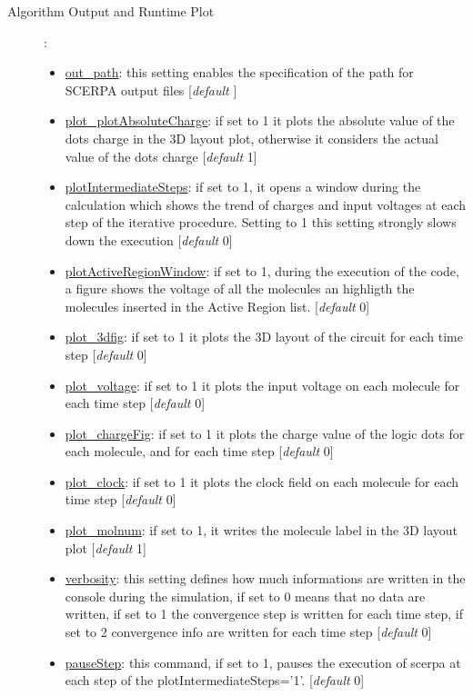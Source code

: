 \documentclass[a4paper,10pt]{article}
\begin{document}
\begin{description}
\item[Algorithm Output and Runtime Plot]:
	\begin{itemize}
	\item \underline{out\_path}: this setting enables the specification of the path for SCERPA output files [\textit{default} \textcolor{mylilas}{\textquotesingle}] 
	\item \underline{plot\_plotAbsoluteCharge}: if set to 1 it plots the absolute value of the dots charge in the 3D layout plot, otherwise it considers the actual value of the dots charge [\textit{default} 1] 
	\item \underline{plotIntermediateSteps}: if set to 1, it opens a window during the calculation which shows the trend of charges and input voltages at each step of the iterative procedure. Setting to 1 this setting strongly slows down the execution [\textit{default} 0] 
	\item \underline{plotActiveRegionWindow}: if set to 1, during the execution of the code, a figure shows the voltage of all the molecules an highligth the molecules inserted in the Active Region list.  [\textit{default} 0] 
	\item \underline{plot\_3dfig}: if set to 1 it plots the 3D layout of the circuit for each time step [\textit{default} 0] 
	\item \underline{plot\_voltage}: if set to 1 it plots the input voltage on each molecule for each time step [\textit{default} 0] 
	\item \underline{plot\_chargeFig}: if set to 1 it plots the charge value of the logic dots for each molecule, and for each time step [\textit{default} 0] 
	\item \underline{plot\_clock}: if set to 1 it plots the clock field on each molecule for each time step [\textit{default} 0]
	\item \underline{plot\_molnum}: if set to 1, it writes the molecule label in the 3D layout plot [\textit{default} 1] 
	\item \underline{verbosity}: this setting defines how much informations are written in the console during the simulation, if set to 0 means that no data are written, if set to 1 the convergence step is written for each time step, if set to 2 convergence info are written for each time step [\textit{default} 0] 
	\item \underline{pauseStep}: this command, if set to 1, pauses the execution of scerpa at each step of the plotIntermediateSteps='1'. [\textit{default} 0] 
	\end{itemize}


\end{description}
\end{document}

